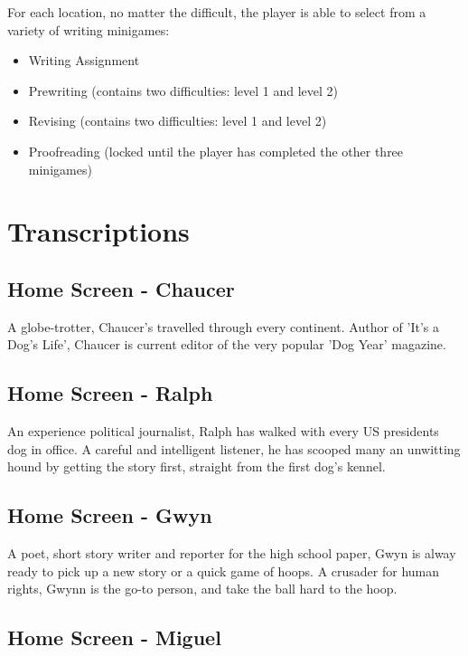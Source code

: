 For each location, no matter the difficult, the player is able to select from a variety of writing minigames:

\begin{itemize}
    \item Writing Assignment
    \item Prewriting (contains two difficulties: level 1 and level 2)
    \item Revising (contains two difficulties: level 1 and level 2)
    \item Proofreading (locked until the player has completed the other three minigames)
\end{itemize}

\section{Transcriptions}

\subsection{Home Screen - Chaucer}

A globe-trotter, Chaucer's travelled through every continent.
Author of 'It's a Dog's Life', Chaucer is current editor of the very popular 'Dog Year' magazine.

\subsection{Home Screen - Ralph}

An experience political journalist, Ralph has walked with every US presidents dog in office.
A careful and intelligent listener, he has scooped many an unwitting hound by getting the story first, straight from the first dog's kennel.

\subsection{Home Screen - Gwyn}

A poet, short story writer and reporter for the high school paper, Gwyn is alway ready to pick up a new story or a quick game of hoops.
A crusader for human rights, Gwynn is the go-to person, and take the ball hard to the hoop.

\subsection{Home Screen - Miguel}

